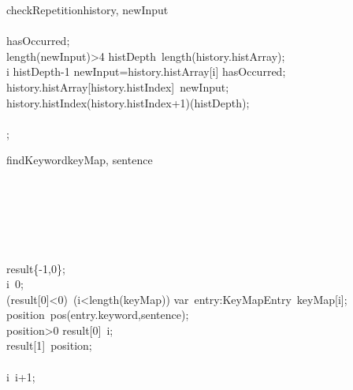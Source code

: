 \documentclass[a4paper,10pt]{article}
\begin{document}
\begin{pseudocode}{checkRepetition}{history, newInput }
\label{checkRepetition}
\\
\\
  hasOccurred\gets\FALSE;\\
  \IF length(newInput)>4 \THEN
  \BEGIN
    histDepth\gets\ length(history.histArray);\\
    \FOR i  \TO histDepth-1  \DO
      \IF newInput=history.histArray[i] \THEN
        hasOccurred\gets\TRUE;\\
    history.histArray[history.histIndex]\gets\ newInput;\\
    history.histIndex\gets(history.histIndex+1)\bmod(histDepth);\\
  \END\\
  ;\\
\ENDPROCEDURE
\end{pseudocode}


\begin{pseudocode}{findKeyword}{keyMap, sentence }
\label{findKeyword}
\\
\\
\\
\\
\\
\\
  \\
  result\gets\{-1,0\};\\
  i\gets\ 0;\\
  \WHILE (result[0]<0)\ \AND(i<length(keyMap)) \DO
  \BEGIN
    var\ entry:KeyMapEntry\gets\ keyMap[i];\\
    position\gets\ pos(entry.keyword,sentence);\\
    \IF position>0 \THEN
    \BEGIN
      result[0]\gets\ i;\\
      result[1]\gets\ position;\\
    \END\\
    i\gets\ i+1;\\
  \END\\
\ENDPROCEDURE
\end{pseudocode}
\end{document}
